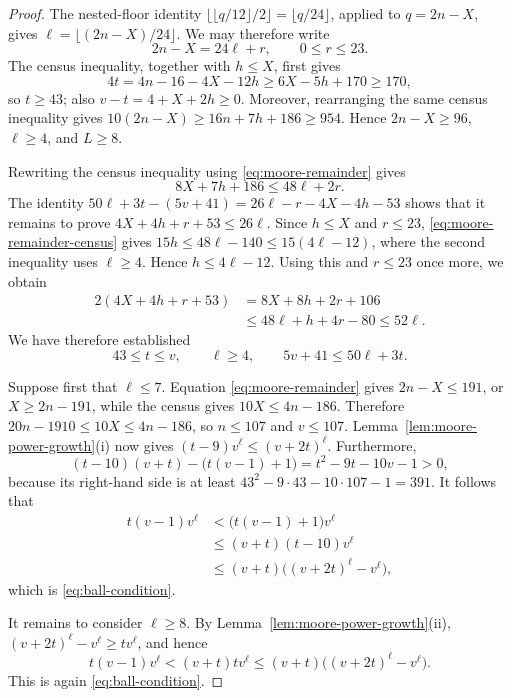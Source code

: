 \documentclass[11pt]{article}
\numberwithin{equation}{section}
\theoremstyle{definition}
\theoremstyle{remark}
\begin{document}
\begin{proof}
The nested-floor identity
\(\lfloor\lfloor q/12\rfloor/2\rfloor=\lfloor q/24\rfloor\), applied to
\(q=2n-X\), gives \(\ell=\lfloor(2n-X)/24\rfloor\).  We may therefore write
\begin{equation}\label{eq:moore-remainder}
 2n-X=24\ell+r,\qquad 0\le r\le23.
\end{equation}
The census inequality, together with \(h\le X\), first gives
\[
 4t=4n-16-4X-12h\ge6X-5h+170\ge170,
\]
so \(t\ge43\); also \(v-t=4+X+2h\ge0\).  Moreover,
rearranging the same census inequality gives
\(10(2n-X)\ge16n+7h+186\ge954\).  Hence
\(2n-X\ge96\), \(\ell\ge4\), and \(L\ge8\).

Rewriting the census inequality using \eqref{eq:moore-remainder} gives
\begin{equation}\label{eq:moore-remainder-census}
 8X+7h+186\le48\ell+2r.
\end{equation}
The identity \(50\ell+3t-(5v+41)=26\ell-r-4X-4h-53\) shows that it remains
to prove \(4X+4h+r+53\le26\ell\).  Since \(h\le X\)
and \(r\le23\), \eqref{eq:moore-remainder-census} gives
\(15h\le48\ell-140\le15(4\ell-12)\), where the second inequality uses
\(\ell\ge4\).  Hence \(h\le4\ell-12\).
Using this and \(r\le23\) once more, we obtain
\[
\begin{aligned}
 2(4X+4h+r+53)
 &=8X+8h+2r+106\\
 &\le48\ell+h+4r-80\le52\ell.
\end{aligned}
\]
We have therefore established
\begin{equation}\label{eq:moore-region}
 43\le t\le v,\qquad \ell\ge4,\qquad
 5v+41\le50\ell+3t.
\end{equation}

Suppose first that \(\ell\le7\).  Equation
\eqref{eq:moore-remainder} gives \(2n-X\le191\), or
\(X\ge2n-191\), while the census gives \(10X\le4n-186\).  Therefore
\(20n-1910\le10X\le4n-186\), so \(n\le107\) and \(v\le107\).
Lemma~\ref{lem:moore-power-growth}\textup{(i)} now gives
\((t-9)v^\ell\le(v+2t)^\ell\).  Furthermore,
\[
 (t-10)(v+t)-\bigl(t(v-1)+1\bigr)
 =t^2-9t-10v-1>0,
\]
because its right-hand side is at least
\(43^2-9\cdot43-10\cdot107-1=391\).  It follows that
\[
\begin{aligned}
 t(v-1)v^\ell
 &<\bigl(t(v-1)+1\bigr)v^\ell\\
 &\le(v+t)(t-10)v^\ell\\
 &\le(v+t)\bigl((v+2t)^\ell-v^\ell\bigr),
\end{aligned}
\]
which is \eqref{eq:ball-condition}.

It remains to consider \(\ell\ge8\).  By
Lemma~\ref{lem:moore-power-growth}\textup{(ii)},
\((v+2t)^\ell-v^\ell\ge t v^\ell\), and hence
\[
 t(v-1)v^\ell<(v+t)t v^\ell
 \le(v+t)\bigl((v+2t)^\ell-v^\ell\bigr).
\]
This is again \eqref{eq:ball-condition}.
\end{proof}
\end{document}
